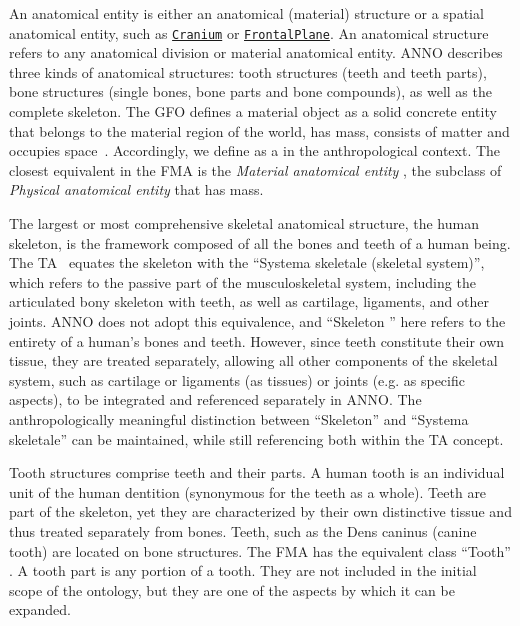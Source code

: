 \documentclass[sw]{iosart2x}
\newcommand{\anno}[1]{\href{https://annosaxfdm.de/ontology/#1}{\texttt{#1}}}
\begin{document}
An anatomical entity is either an anatomical (material) structure or a spatial anatomical entity, such as \anno{Cranium} or \anno{FrontalPlane}.
An anatomical structure refers to any anatomical division or material anatomical entity.
ANNO describes three kinds of anatomical structures: tooth structures (teeth and teeth parts), bone structures (single bones, bone parts and bone compounds), as well as the complete skeleton.
The GFO defines a material object  as a solid concrete entity that belongs to the material region of the world, has mass, consists of matter and occupies space~\citep{gfospace}.
Accordingly, we define  as a  in the anthropological context.
The closest equivalent in the FMA is the \emph{Material anatomical entity} , the subclass of \emph{Physical anatomical entity}  that has mass.

The largest or most comprehensive skeletal anatomical structure, the human skeleton, is the framework composed of all the bones and teeth of a human being.
The TA~\citep{ta2} equates the skeleton with the \enquote{Systema skeletale (skeletal system)}, which refers to the passive part of the musculoskeletal system, including the articulated bony skeleton with teeth, as well as cartilage, ligaments, and other joints.
ANNO does not adopt this equivalence, and \enquote{Skeleton } here refers to the entirety of a human's bones and teeth.
However, since teeth constitute their own tissue, they are treated separately, allowing all other components of the skeletal system, such as cartilage or ligaments (as tissues) or joints (e.g. as specific aspects), to be integrated and referenced separately in ANNO.
The anthropologically meaningful distinction between \enquote{Skeleton} and \enquote{Systema skeletale} can be maintained, while still referencing both within the TA concept.

Tooth structures comprise teeth and their parts.
A human tooth is an individual unit of the human dentition (synonymous for the teeth as a whole).
Teeth are part of the skeleton, yet they are characterized by their own distinctive tissue and thus treated separately from bones.
Teeth, such as the Dens caninus (canine tooth) are located on bone structures.
The FMA has the equivalent class \enquote{Tooth} .
A tooth part is any portion of a tooth.
They are not included in the initial scope of the ontology, but they are one of the aspects by which it can be expanded.
\end{document}

